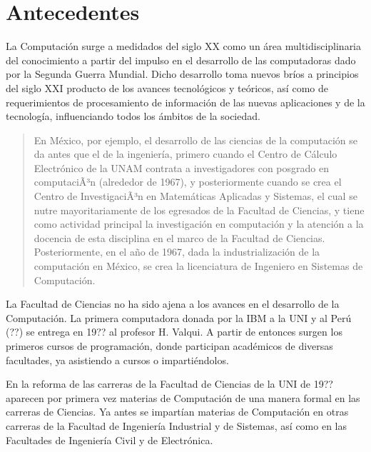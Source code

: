 \section{Antecedentes}\label{sec:cs-antecedentes}

La Computaci\'on surge a medidados del siglo XX como un \'area multidisciplinaria del conocimiento a partir del impulso en el desarrollo de las computadoras dado por la Segunda Guerra Mundial. Dicho desarrollo toma nuevos br\'ios a principios del siglo XXI producto de los avances tecnol\'ogicos y te\'oricos, as\'i como de requerimientos de procesamiento de informaci\'on de las nuevas aplicaciones y de la tecnolog\'ia, influenciando todos los \'ambitos de la sociedad.

\begin{quote}
En M\'exico, por ejemplo, el desarrollo de las ciencias de la computaci\'on se da antes que el de la ingenier\'ia, primero cuando el Centro de C\'alculo Electr\'onico de la UNAM contrata a investigadores con posgrado en computaciÃ³n (alrededor de 1967), y posteriormente cuando se crea el Centro de InvestigaciÃ³n en Matem\'aticas Aplicadas y Sistemas, el cual se nutre mayoritariamente de los egresados de la Facultad de Ciencias, y tiene como actividad principal la investigaci\'on en computaci\'on y la atenci\'on a la docencia de esta disciplina en el marco de la Facultad de Ciencias. Posteriormente, en el a\~no de 1967, dada la industrializaci\'on de la computaci\'on en M\'exico, se crea la licenciatura de Ingeniero en Sistemas de Computaci\'on.
\end{quote} 


La Facultad de Ciencias no ha sido ajena a los avances en el desarrollo de la Computaci\'on. La primera computadora donada por la IBM a la UNI y al Per\'u (??) se entrega en 19?? al profesor H. Valqui. A partir de entonces surgen los primeros cursos de programaci\'on, donde participan acad\'emicos de diversas facultades, ya asistiendo a cursos o imparti\'endolos.

En la reforma de las carreras de la Facultad de Ciencias de la UNI de 19?? aparecen por primera vez materias de Computaci\'on de una manera formal en las carreras de Ciencias. Ya antes se impart\'ian materias de Computaci\'on en otras carreras de la Facultad de Ingenier\'ia Industrial y de Sistemas, as\'i como en las Facultades de Ingenier\'ia Civil y de Electr\'onica.
